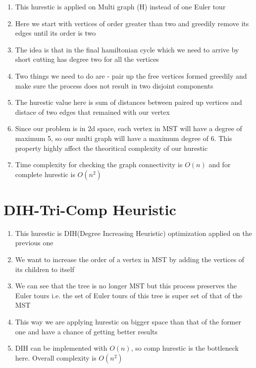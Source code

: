 \begin{enumerate}
    \item This hurestic is applied on Multi graph (H) instead of one Euler tour
    \item Here we start with vertices of order greater than two and greedily remove its edges until its order is two
    \item The idea is that in the final hamiltonian cycle which we need to arrive by short cutting has degree two for all the vertices
    \item Two things we need to do are - pair up the free vertices formed greedily and make sure the process does not result in two disjoint components
    \item The hurestic value here is sum of distances between paired up vertices and distace of two edges that remained with our vertex
    \item Since our problem is in 2d space, each vertex in MST will have a degree of maximum 5, so our multi graph will have a maximum degree of 6. This property highly affect the theoritical complexity of our hurestic
    \item Time complexity for checking the graph connectivity is $O(n)$ and for complete hurestic is $O(n^2)$
\end{enumerate}

\section{DIH-Tri-Comp Heuristic}

\begin{enumerate}
    \item This hurestic is DIH(Degree Increasing Heuristic) optimization applied on the previous one
    \item We want to increase the order of a vertex in MST by adding the vertices  of its children to itself
    \item We can see that the tree is no longer MST but this process preserves the Euler tours i.e. the set of Euler tours of this tree is super set of that of the MST
    \item This way we are applying hurestic on bigger space than that of the former one and have a chance of getting better results
    \item  DIH can be implemented with $O(n)$, so comp hurestic is the bottleneck here. Overall complexity is $O(n^2)$
\end{enumerate}

